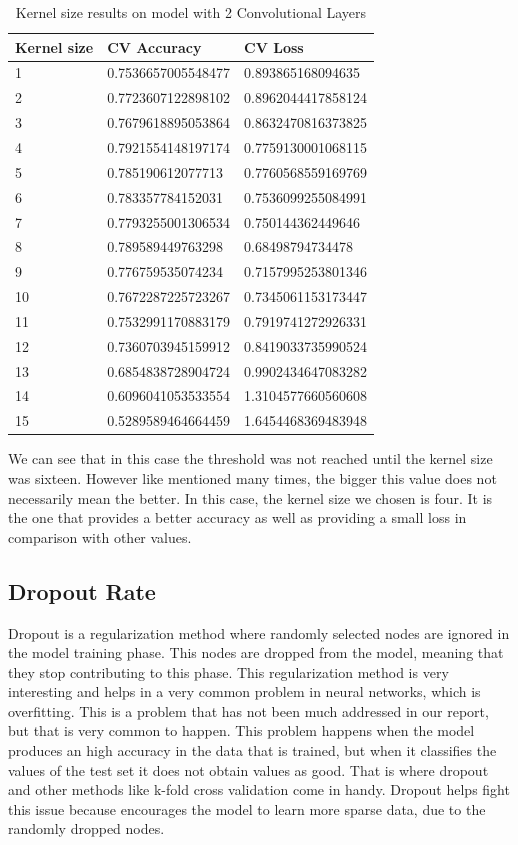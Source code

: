 \documentclass[conference]{IEEEtran}
\begin{document}
\begin{table}[H]
\centering
\caption{Kernel size results on model with 2 Convolutional Layers}
\begin{tabular}{ | m{2.5em} | m{3.2cm}| m{3.2cm} | } 
\hline
Kernel size & CV Accuracy & CV Loss \\ 
\hline
1 & 0.7536657005548477 & 0.893865168094635 \\
\hline
2 & 0.7723607122898102 & 0.8962044417858124 \\
\hline
3 & 0.7679618895053864 & 0.8632470816373825 \\
\hline
4 & 0.7921554148197174 & 0.7759130001068115 \\
\hline
5 & 0.785190612077713 & 0.7760568559169769 \\
\hline
6 & 0.783357784152031 & 0.7536099255084991 \\
\hline
7 & 0.7793255001306534 & 0.750144362449646 \\
\hline
8 & 0.789589449763298 & 0.68498794734478 \\
\hline
9 & 0.776759535074234 & 0.7157995253801346 \\
\hline
10 & 0.7672287225723267 & 0.7345061153173447 \\
\hline
11 & 0.7532991170883179 & 0.7919741272926331 \\
\hline
12 & 0.7360703945159912 & 0.8419033735990524 \\
\hline
13 & 0.6854838728904724 & 0.9902434647083282 \\
\hline
14 & 0.6096041053533554 & 1.3104577660560608 \\
\hline
15 & 0.5289589464664459 & 1.6454468369483948 \\
\hline
\end{tabular}
\end{table}

We can see that in this case the threshold was not reached until the kernel size was sixteen. However like mentioned many times, the bigger this value does not necessarily mean the better. In this case, the kernel size we chosen is four. It is the one that provides a better accuracy as well as providing a small loss in comparison with other values.

\subsection{Dropout Rate \cite{E} \cite{C}}

Dropout is a regularization method where randomly selected nodes are ignored in the model training phase. This nodes are dropped from the model, meaning that they stop contributing to this phase. This regularization method is very interesting and helps in a very common problem in neural networks, which is overfitting.
This is a problem that has not been much addressed in our report, but that is very common to happen. This problem happens when the model produces an high accuracy in the data that is trained, but when it classifies the values of the test set it does not obtain values as good. That is where dropout and other methods like k-fold cross validation come in handy. Dropout helps fight this issue because encourages the model to learn more sparse data, due to the randomly dropped nodes.
\end{document}
